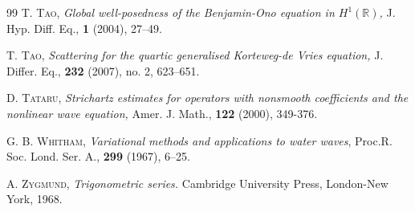 \documentclass{amsart}
\theoremstyle{definition}
\theoremstyle{remark}
\numberwithin{equation}{section}
\begin{document}
\begin{thebibliography}{99}
\newblock \textsc{T. Tao},
\newblock \emph{Global well-posedness of the Benjamin-Ono equation in $H^1(\mathbb R)$,}
\newblock J. Hyp. Diff. Eq., \textbf{1} (2004), 27--49.

\newblock \textsc{T. Tao},
\newblock \emph{Scattering for the quartic generalised Korteweg-de Vries equation,}
\newblock J. Differ. Eq.,  {\bf 232} (2007), no. 2, 623--651.


 \textsc{D. Tataru,}
\emph{Strichartz estimates for operators with nonsmooth coefficients and the nonlinear wave equation,}
Amer. J. Math., \textbf{122} (2000), 349-376.


\textsc{G. B. Whitham}, 
\emph{Variational methods and applications to water waves}, 
Proc.R. Soc. Lond. Ser. A., \textbf{299} (1967), 6--25.

\textsc{A. Zygmund}, 
\textit{Trigonometric series.} Cambridge University Press, London-New York, 1968.


\end{thebibliography}
\end{document}
